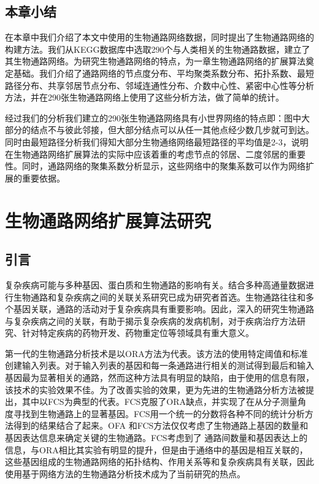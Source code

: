 \section{本章小结}

在本章中我们介绍了本文中使用的生物通路网络数据，同时提出了生物通路网络的构建方法。我们从KEGG数据库中选取290个与人类相关的生物通路数据，建立了其生物通路网络。为研究生物通路网络的特点，为一章生物通路网络的扩展算法奠定基础。我们介绍了通路网络的节点度分布、平均聚类系数分布、拓扑系数、最短路径分布、共享邻居节点分布、邻域连通性分布、介数中心性、紧密中心性等分析方法，并在290张生物通路网络上使用了这些分析方法，做了简单的统计。

经过我们的分析我们建立的290张生物通路网络具有小世界网络的特点即：图中大部分的结点不与彼此邻接，但大部分结点可以从任一其他点经少数几步就可到达。同时由最短路径分析我们得知大部分生物通络网络最短路径的平均值是2-3，说明在生物通路网络扩展算法的实际中应该着重的考虑节点的邻居、二度邻居的重要性。同时，通路网络的聚集系数分析显示，这些网络中的聚集系数可以作为网络扩展的重要依据。

\chapter{生物通路网络扩展算法研究}
\section{引言}
复杂疾病可能与多种基因、蛋白质和生物通路的影响有关\cite{zhang2016network}。结合多种高通量数据进行生物通路和复杂疾病之间的关联关系研究已成为研究者首选。生物通路往往和多个基因关联，通路的活动对于复杂疾病具有重要影响。因此，深入的研究生物通路与复杂疾病之间的关联，有助于揭示复杂疾病的发病机制，对于疾病治疗方法研究、针对特定疾病的药物开发、药物重定位等领域具有重大意义。

第一代的生物通路分析技术是以ORA\cite{goeman2007analyzing}方法为代表。该方法的使用特定阈值和标准创建输入列表。对于输入列表的基因和每一条通路进行相关的测试得到最后和输入基因最为显著相关的通路，然而这种方法具有明显的缺陷，由于使用的信息有限，该技术的实验效果不佳。为了改善实验的效果，更为先进的生物通路分析方法被提出，其中以FCS\cite{lee2011prioritizing}为典型的代表。FCS克服了ORA缺点，并实现了在从分子测量角度寻找到生物通路上的显著基因。FCS用一个统一的分数将各种不同的统计分析方法得到的结果结合了起来。OFA 和FCS方法仅仅考虑了生物通路上基因的数量和基因表达信息来确定关键的生物通路。FCS\cite{lee2011prioritizing}考虑到了
通路间数量和基因表达上的信息，与ORA相比其实验有明显的提升，但是由于通络中的基因是相互关联的，这些基因组成的生物通路网络的拓扑结构、作用关系等和复杂疾病具有关联，因此使用基于网络方法的生物通路分析技术成为了当前研究的热点。

